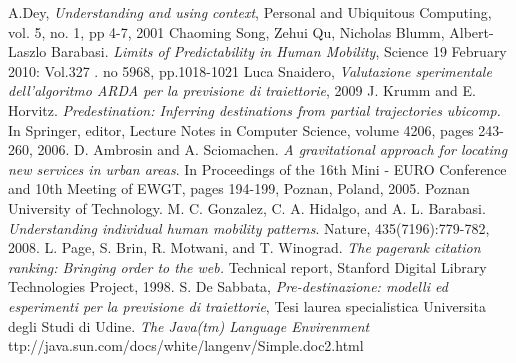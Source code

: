 \begin{thebibliography}{999}
 A.Dey, \textit{Understanding and using context}, Personal and Ubiquitous Computing, vol. 5, no. 1, pp 4-7, 2001
 Chaoming Song, Zehui Qu, Nicholas Blumm, Albert-Laszlo Barabasi. \textit{Limits of Predictability in Human Mobility}, Science 19 February 2010: Vol.327 . no 5968, pp.1018-1021
 Luca Snaidero, \textit{Valutazione sperimentale dell'algoritmo ARDA per la previsione di traiettorie}, 2009
 J. Krumm and E. Horvitz. \textit{Predestination: Inferring destinations from partial trajectories ubicomp.} In Springer, editor, Lecture Notes in Computer Science, volume 4206, pages 243-260, 2006.
 D. Ambrosin and A. Sciomachen. \textit{A gravitational approach for locating new services in urban areas}. In Proceedings of the 16th Mini - EURO Conference and 10th Meeting of EWGT, pages 194-199, Poznan, Poland, 2005. Poznan University of Technology.
 M. C. Gonzalez, C. A. Hidalgo, and A. L. Barabasi. \textit{Understanding individual human mobility patterns}. Nature, 435(7196):779-782, 2008.
 L. Page, S. Brin, R. Motwani, and T. Winograd. \textit{The pagerank citation ranking: Bringing order to the web.} Technical report, Stanford Digital Library Technologies Project, 1998.
 S. De Sabbata, \textit{Pre-destinazione: modelli ed esperimenti per la previsione di traiettorie}, Tesi laurea specialistica Universita degli Studi di Udine.
 \textit{The Java(tm) Language Envirenment} ttp://java.sun.com/docs/white/langenv/Simple.doc2.html
\end{thebibliography}
